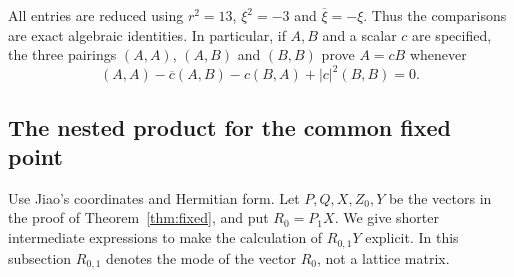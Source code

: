 \documentclass[11pt,reqno]{amsart}
\theoremstyle{definition}\newtheorem{definition}[theorem]{Definition}
\theoremstyle{remark}\newtheorem{remark}[theorem]{Remark}
\numberwithin{equation}{section}
\begin{document}
All entries are reduced using $r^2=13$, $\xi^2=-3$ and $\overline\xi=-\xi$. Thus the comparisons are exact algebraic identities. In particular, if $A,B$ and a scalar $c$ are specified, the three pairings $(A,A)$, $(A,B)$ and $(B,B)$ prove $A=cB$ whenever
\begin{equation}\label{eq:normtest}
 (A,A)-\overline c(A,B)-c(B,A)+|c|^2(B,B)=0.
\end{equation}

\subsection{The nested product for the common fixed point}\label{app:nested}
Use Jiao's coordinates and Hermitian form. Let $P,Q,X,Z_0,Y$ be the vectors in the proof of Theorem~\ref{thm:fixed}, and put $R_0=P_1X$. We give shorter intermediate expressions to make the calculation of $R_{0,1}Y$ explicit. In this subsection $R_{0,1}$ denotes the mode of the vector $R_0$, not a lattice matrix.
\end{document}
